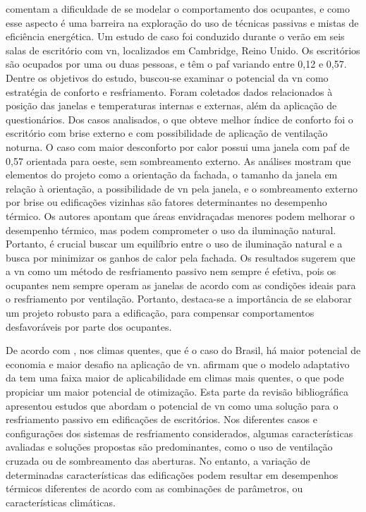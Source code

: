  comentam a dificuldade de se modelar o comportamento dos ocupantes, e como esse aspecto é uma barreira na exploração do uso de técnicas passivas e mistas de eficiência energética. Um estudo de caso foi conduzido durante o verão em seis salas de escritório com \acrshort{vn}, localizados em Cambridge, Reino Unido. Os escritórios são ocupados por uma ou duas pessoas, e têm o \acrshort{paf} variando entre 0,12 e 0,57. Dentre os objetivos do estudo, buscou-se examinar o potencial da \acrshort{vn} como estratégia de conforto e resfriamento. Foram coletados dados relacionados à posição das janelas e temperaturas internas e externas, além da aplicação de questionários.
Dos casos analisados, o que obteve melhor índice de conforto foi o escritório com brise externo e com possibilidade de aplicação de ventilação noturna. O caso com maior desconforto por calor possui uma janela com \acrshort{paf} de 0,57 orientada para oeste, sem sombreamento externo. As análises mostram que elementos do projeto como a orientação da fachada, o tamanho da janela em relação à orientação, a possibilidade de \acrlong{vn} pela janela, e o sombreamento externo por brise ou edificações vizinhas são fatores determinantes no desempenho térmico. Os autores apontam que áreas envidraçadas menores podem melhorar o desempenho térmico, mas podem comprometer o uso da iluminação natural. Portanto, é crucial buscar um equilíbrio entre o uso de iluminação natural e a busca por minimizar os ganhos de calor pela fachada. Os resultados sugerem que a \acrshort{vn} como um método de resfriamento passivo nem sempre é efetiva, pois os ocupantes nem sempre operam as janelas de acordo com as condições ideais para o resfriamento por ventilação. Portanto, destaca-se a importância de se elaborar um projeto robusto para a edificação, para compensar comportamentos desfavoráveis por parte dos ocupantes.

De acordo com , nos climas quentes, que é o caso do Brasil, há maior potencial de economia e maior desafio na aplicação de \acrshort{vn}.  afirmam que o modelo adaptativo da  tem uma faixa maior de aplicabilidade em climas mais quentes, o que pode propiciar um maior potencial de otimização.
Esta parte da revisão bibliográfica apresentou estudos que abordam o potencial de \acrshort{vn} como uma solução para o resfriamento passivo em edificações de escritórios. Nos diferentes casos e configurações dos sistemas de resfriamento considerados, algumas características avaliadas e soluções propostas são predominantes, como o uso de ventilação cruzada ou de sombreamento das aberturas.
No entanto, a variação de determinadas características das edificações podem resultar em desempenhos térmicos diferentes de acordo com as combinações de parâmetros, ou características climáticas. 

